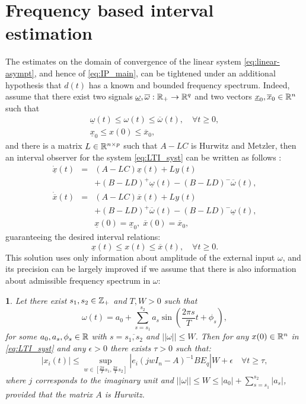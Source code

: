 \documentclass[letterpaper, 10 pt, conference]{ieeeconf}
\theoremstyle{plain}
\newtheorem{lem}{\protect\lemmaname}
\theoremstyle{definition}
\theoremstyle{plain}
\theoremstyle{plain}
\theoremstyle{remark}
\providecommand{\lemmaname}{Lemma}
\begin{document}
\section{\label{sec:Frequency} Frequency based interval estimation}
The estimates on the domain of convergence of the linear system \eqref{eq:linear-asympt}, and hence of \eqref{eq:IP_main}, can be tightened under an additional hypothesis that $d(t)$ has a known and bounded frequency spectrum.
Indeed, assume that there exist two signals $\underline{\omega},\overline{\omega}:\mathbb{R}_{+}\to\mathbb{R}^{q}$ and two vectors $\underline{x}_{0},\overline{x}_{0}\in\mathbb{R}^{n}$ such that
\begin{gather*}
\underline{\omega}(t)\leq\omega(t)\leq\overline{\omega}(t),\quad\forall t\geq0,\\
\underline{x}_{0}\leq x(0)\leq\overline{x}_{0},
\end{gather*} and there is a matrix $L\in\mathbb{R}^{n\times p}$ such that $A-LC$ is Hurwitz and Metzler, then an interval observer for the system \eqref{eq:LTI_syst} can be written as follows \cite{REZ11}:
\begin{eqnarray}
\dot{\underline{x}}(t) & = & (A-LC)\underline{x}(t)+Ly(t)\nonumber \\
 &  & +(B-LD)^{+}\underline{\omega}(t)-(B-LD)^{-}\overline{\omega}(t),\nonumber \\
\dot{\overline{x}}(t) & = & (A-LC)\overline{x}(t)+Ly(t)\label{eq:IO_LTI}\\
 &  & +(B-LD)^{+}\overline{\omega}(t)-(B-LD)^{-}\underline{\omega}(t),\nonumber \\
 &  & \underline{x}(0)=\underline{x}_{0},\;\overline{x}(0)=\overline{x}_{0},\nonumber 
\end{eqnarray}
guaranteeing the desired interval relations:
\[
\underline{x}(t)\leq x(t)\leq\overline{x}(t),\quad\forall t\geq0.
\]
This solution uses only information about amplitude of the external input $\omega$, and its precision can be largely improved if we assume that there is also information about admissible frequency spectrum in $\omega$:
\begin{lem}
\label{lem:IntFreq} Let there exist $s_{1},s_{2}\in\mathbb{Z}_{+}$ and $T,W>0$
such that
\[
\omega(t)=a_{0}+\sum_{s=s_{1}}^{s_{2}}a_{s}\sin\left(\frac{2\pi s}{T}t+\phi_{s}\right),
\]
for some $a_{0},a_{s},\phi_{s}\in\mathbb{R}$ with $s=\overline{s_{1},s_{2}}$ and $||\omega||\leq W$. Then for any $x(0)\in\mathbb{R}^{n}$ in \eqref{eq:LTI_syst} and any $\epsilon>0$ there exists $\tau>0$ such that:
\[
|x_{i}(t)|\leq\sup_{w\in[\frac{2\pi}{T}s_{1},\frac{2\pi}{T}s_{2}]}|e_{i}(jwI_{n}-A)^{-1}BE_{q}|W+\epsilon\quad\forall t\geq\tau,
\]
where $j$ corresponds to the imaginary unit and $||\omega||\leq W\leq |a_0|+\sum_{s=s_1}^{s_2} |a_s|$, provided that the matrix $A$ is Hurwitz.
\end{lem}
\end{document}
